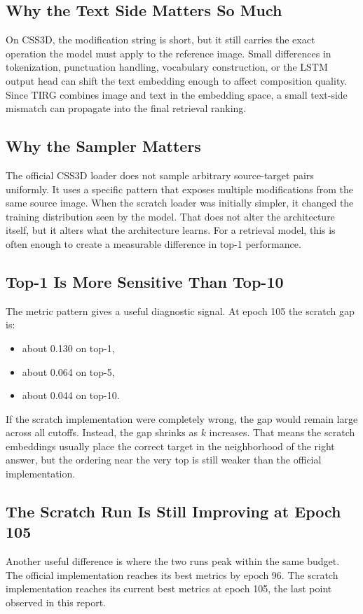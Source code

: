 \documentclass[11pt]{article}
\begin{document}
\subsection{Why the Text Side Matters So Much}
On CSS3D, the modification string is short, but it still carries the exact operation the model must apply to the reference image. Small differences in tokenization, punctuation handling, vocabulary construction, or the LSTM output head can shift the text embedding enough to affect composition quality. Since TIRG combines image and text in the embedding space, a small text-side mismatch can propagate into the final retrieval ranking.

\subsection{Why the Sampler Matters}
The official CSS3D loader does not sample arbitrary source-target pairs uniformly. It uses a specific pattern that exposes multiple modifications from the same source image. When the scratch loader was initially simpler, it changed the training distribution seen by the model. That does not alter the architecture itself, but it alters what the architecture learns. For a retrieval model, this is often enough to create a measurable difference in top-1 performance.

\subsection{Top-1 Is More Sensitive Than Top-10}
The metric pattern gives a useful diagnostic signal. At epoch 105 the scratch gap is:
\begin{itemize}[leftmargin=*]
  \item about 0.130 on top-1,
  \item about 0.064 on top-5,
  \item about 0.044 on top-10.
\end{itemize}

If the scratch implementation were completely wrong, the gap would remain large across all cutoffs. Instead, the gap shrinks as $k$ increases. That means the scratch embeddings usually place the correct target in the neighborhood of the right answer, but the ordering near the very top is still weaker than the official implementation.

\subsection{The Scratch Run Is Still Improving at Epoch 105}
Another useful difference is where the two runs peak within the same budget. The official implementation reaches its best metrics by epoch 96. The scratch implementation reaches its current best metrics at epoch 105, the last point observed in this report.
\end{document}
